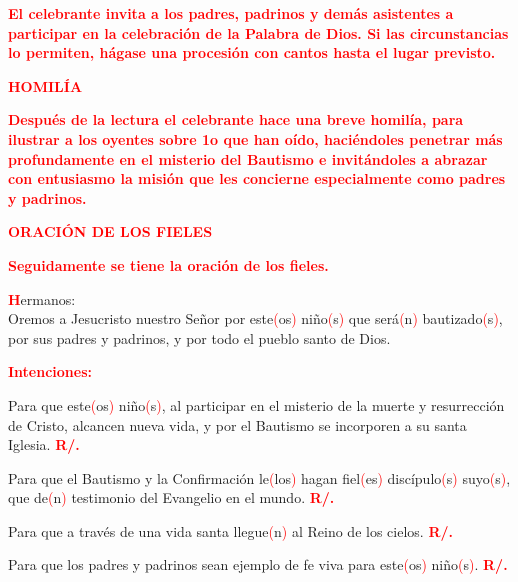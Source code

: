 \documentclass[12pt, letterpaper]{report}
\begin{document}
\large {\bfseries \textcolor{red}{El celebrante invita a los padres, padrinos y dem\'as asistentes a participar en la celebraci\'on de la Palabra de Dios. Si las circunstancias lo permiten, h\'agase una procesi\'on con cantos hasta el lugar previsto.}} 

\Large {\bfseries \textcolor{red}{HOMIL\'IA}} 

\large {\bfseries \textcolor{red}{Despu\'es de la lectura el celebrante hace una breve homil\'ia, para ilustrar a los oyentes sobre 1o que han o\'ido, haci\'endoles penetrar m\'as profundamente en el misterio del Bautismo e invit\'andoles a abrazar con entusiasmo la misi\'on que les concierne especialmente como padres y padrinos.}} 

\Large {\bfseries \textcolor{red}{ORACI\'ON DE LOS FIELES}} 

\large {\bfseries \textcolor{red}{Seguidamente se tiene la oraci\'on de los fieles.}} 

\lettrine[lines=1]{\bfseries \textcolor{red}{H}}{}\Large ermanos:\\
Oremos a Jesucristo nuestro Se\~nor por este\textcolor{red}{(}os\textcolor{red}{)} ni\~no\textcolor{red}{(}s\textcolor{red}{)} que ser\'a\textcolor{red}{(}n\textcolor{red}{)} bautizado\textcolor{red}{(}s\textcolor{red}{)}, por sus padres y padrinos, y por todo el pueblo santo de Dios.

\noindent
\large {\bfseries \textcolor{red}{Intenciones:}} 

\Large {Para que este\textcolor{red}{(}os\textcolor{red}{)} ni\~no\textcolor{red}{(}s\textcolor{red}{)}, al participar en el misterio de la muerte y resurrecci\'on de Cristo, alcancen nueva vida, y por el Bautismo se incorporen a su santa Iglesia.
\hspace{1cm} \bfseries \textcolor{red}{R/.}}

\Large {Para que el Bautismo y la Confirmaci\'on le\textcolor{red}{(}los\textcolor{red}{)} hagan fiel\textcolor{red}{(}es\textcolor{red}{)} disc\'ipulo\textcolor{red}{(}s\textcolor{red}{)} suyo\textcolor{red}{(}s\textcolor{red}{)}, que de\textcolor{red}{(}n\textcolor{red}{)} testimonio del Evangelio en el mundo. 
\hspace{1cm} \bfseries \textcolor{red}{R/.}}

\Large {Para que a trav\'es de una vida santa llegue\textcolor{red}{(}n\textcolor{red}{)} al Reino de los cielos.
\hspace{1cm} \bfseries \textcolor{red}{R/.}}

\Large {Para que los padres y padrinos sean ejemplo de fe viva para este\textcolor{red}{(}os\textcolor{red}{)} ni\~no\textcolor{red}{(}s\textcolor{red}{)}.
\hspace{1cm} \bfseries \textcolor{red}{R/.}}
\end{document}
